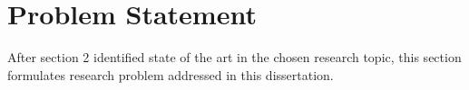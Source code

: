 \chapter{Problem Statement}
\noindent 
After section 2 identified state of the art in the chosen research topic, this section formulates research problem addressed in this dissertation.

